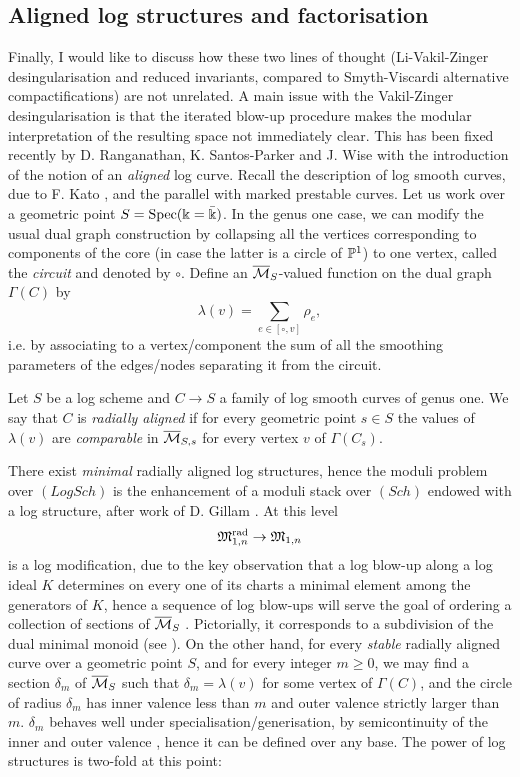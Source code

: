 \subsection{Aligned log structures and factorisation} Finally, I would like to discuss how these two lines of thought (Li-Vakil-Zinger desingularisation and reduced invariants, compared to Smyth-Viscardi alternative compactifications) are not unrelated. A main issue with the Vakil-Zinger desingularisation is that the iterated blow-up procedure makes the modular interpretation of the resulting space not immediately clear. This has been fixed recently by D. Ranganathan, K. Santos-Parker and J. Wise with the introduction of the notion of an \emph{aligned} log curve. Recall the description of log smooth curves, due to F. Kato \cite{KatoF}, and the parallel with marked prestable curves. Let us work over a geometric point $S=\operatorname{Spec}(\Bbbk=\bar{\Bbbk})$. In the genus one case, we can modify the usual dual graph construction by collapsing all the vertices corresponding to components of the core (in case the latter is a circle of $\mathbb P^1$) to one vertex, called the \emph{circuit} and denoted by $\circ$. Define an $\overline{\mathcal{M}}_S$-valued function on the dual graph $\Gamma(C)$ by \[\lambda(v)=\sum_{e\in[\circ,v]}\rho_e,\] i.e. by associating to a vertex/component the sum of all the smoothing parameters of the edges/nodes separating it from the circuit.
\begin{dfn}
 Let $S$ be a log scheme and $C\to S$ a family of log smooth curves of genus one. We say that $C$ is \emph{radially aligned} if for every geometric point $s\in S$ the values of $\lambda(v)$ are \emph{comparable} in $\overline{\mathcal{M}}_{S,s}$ for every vertex $v$ of $\Gamma(C_s)$.
\end{dfn}
There exist \emph{minimal} radially aligned log structures, hence the moduli problem over $(LogSch)$ is the enhancement of a moduli stack over $(Sch)$ endowed with a log structure, after work of D. Gillam \cite{Gillam}. At this level
\[\mathfrak M^{\mathrm{rad}}_{1,n}\rightarrow\mathfrak M_{1,n}\]
is a log modification, due to the key observation that a log blow-up along a log ideal $K$ determines on every one of its charts a minimal element among the generators of $K$, hence a sequence of log blow-ups will serve the goal of ordering a collection of sections of $\overline{\mathcal{M}}_S$ \cite[Lemma 3.36]{Kelithesis}. Pictorially, it corresponds to a subdivision of the dual minimal monoid (see \cite[\S 3.3-3.4]{RSPW}). On the other hand, for every \emph{stable} radially aligned curve over a geometric point $S$, and for every integer $m\geq0$, we may find a section $\delta_m$ of $\overline{\mathcal{M}}_S$ such that $\delta_m=\lambda(v)$ for some vertex of $\Gamma(C)$, and the circle of radius $\delta_m$ has inner valence less than $m$ and outer valence strictly larger than $m$. $\delta_m$ behaves well under specialisation/generisation, by semicontinuity of the inner and outer valence \cite[Proposition 3.5.2]{RSPW}, hence it can be defined over any base. The power of log structures is two-fold at this point:
